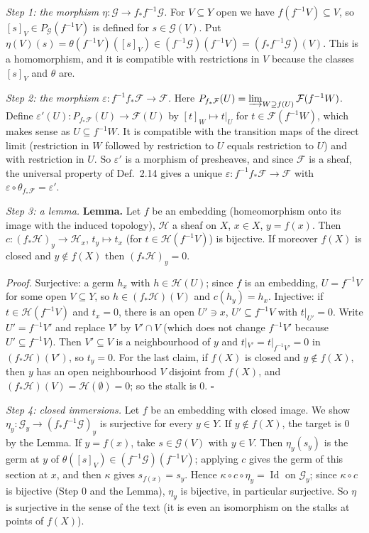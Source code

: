 \documentclass[11pt]{article}
\begin{document}
\emph{Step 1: the morphism $\eta:\mathcal{G}\to f_*f^{-1}\mathcal{G}$.} For $V\subseteq Y$ open we have $f(f^{-1}V)\subseteq V$, so $[s]_V\in P_{\mathcal{G}}(f^{-1}V)$ is defined for $s\in\mathcal{G}(V)$. Put $\eta(V)(s)=\theta(f^{-1}V)([s]_V)\in(f^{-1}\mathcal{G})(f^{-1}V)=(f_*f^{-1}\mathcal{G})(V)$. This is a homomorphism, and it is compatible with restrictions in $V$ because the classes $[s]_V$ and $\theta$ are.

\emph{Step 2: the morphism $\varepsilon:f^{-1}f_*\mathcal{F}\to\mathcal{F}$.} Here $P_{f_*\mathcal{F}}(U)=\varinjlim_{W\supseteq f(U)}\mathcal{F}(f^{-1}W)$. Define $\varepsilon'(U):P_{f_*\mathcal{F}}(U)\to\mathcal{F}(U)$ by $[t]_W\mapsto t|_U$ for $t\in\mathcal{F}(f^{-1}W)$, which makes sense as $U\subseteq f^{-1}W$. It is compatible with the transition maps of the direct limit (restriction in $W$ followed by restriction to $U$ equals restriction to $U$) and with restriction in $U$. So $\varepsilon'$ is a morphism of presheaves, and since $\mathcal{F}$ is a sheaf, the universal property of Def.~2.14 gives a unique $\varepsilon:f^{-1}f_*\mathcal{F}\to\mathcal{F}$ with $\varepsilon\circ\theta_{f_*\mathcal{F}}=\varepsilon'$.

\emph{Step 3: a lemma.} \textbf{Lemma.} Let $f$ be an embedding (homeomorphism onto its image with the induced topology), $\mathcal{H}$ a sheaf on $X$, $x\in X$, $y=f(x)$. Then $c:(f_*\mathcal{H})_y\to\mathcal{H}_x$, $t_y\mapsto t_x$ (for $t\in\mathcal{H}(f^{-1}V)$) is bijective. If moreover $f(X)$ is closed and $y\notin f(X)$ then $(f_*\mathcal{H})_y=0$.

\emph{Proof.} Surjective: a germ $h_x$ with $h\in\mathcal{H}(U)$; since $f$ is an embedding, $U=f^{-1}V$ for some open $V\subseteq Y$, so $h\in(f_*\mathcal{H})(V)$ and $c(h_y)=h_x$. Injective: if $t\in\mathcal{H}(f^{-1}V)$ and $t_x=0$, there is an open $U'\ni x$, $U'\subseteq f^{-1}V$ with $t|_{U'}=0$. Write $U'=f^{-1}V'$ and replace $V'$ by $V'\cap V$ (which does not change $f^{-1}V'$ because $U'\subseteq f^{-1}V$). Then $V'\subseteq V$ is a neighbourhood of $y$ and $t|_{V'}=t|_{f^{-1}V'}=0$ in $(f_*\mathcal{H})(V')$, so $t_y=0$. For the last claim, if $f(X)$ is closed and $y\notin f(X)$, then $y$ has an open neighbourhood $V$ disjoint from $f(X)$, and $(f_*\mathcal{H})(V)=\mathcal{H}(\emptyset)=0$; so the stalk is $0$. $\square$

\emph{Step 4: closed immersions.} Let $f$ be an embedding with closed image. We show $\eta_y:\mathcal{G}_y\to(f_*f^{-1}\mathcal{G})_y$ is surjective for every $y\in Y$. If $y\notin f(X)$, the target is $0$ by the Lemma. If $y=f(x)$, take $s\in\mathcal{G}(V)$ with $y\in V$. Then $\eta_y(s_y)$ is the germ at $y$ of $\theta([s]_V)\in(f^{-1}\mathcal{G})(f^{-1}V)$; applying $c$ gives the germ of this section at $x$, and then $\kappa$ gives $s_{f(x)}=s_y$. Hence $\kappa\circ c\circ\eta_y=\operatorname{Id}$ on $\mathcal{G}_y$; since $\kappa\circ c$ is bijective (Step 0 and the Lemma), $\eta_y$ is bijective, in particular surjective. So $\eta$ is surjective in the sense of the text (it is even an isomorphism on the stalks at points of $f(X)$).
\end{document}

